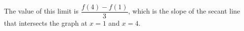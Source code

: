 \documentclass{article}
\begin{document}
\begin{enumerate}[resume]
\begin{enumerate}
    \begin{solution}
    The value of this limit is $\dfrac{f(4)-f(1)}{3}$, which is the slope of the secant line that intersects the graph at $x=1$ and $x=4$.
      \begin{center}
      \end{center}
    \end{solution}

  \end{enumerate}

\end{enumerate}
\end{document}

